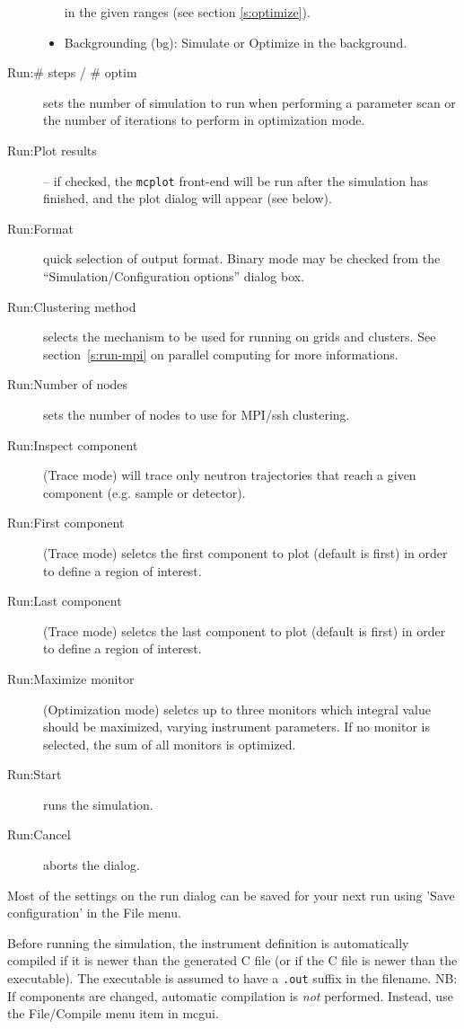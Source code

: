 \begin{description}
\begin{itemize}
    in the given ranges (see section \ref{s:optimize}).
  \item Backgrounding (bg): Simulate or Optimize in the background.
\end{itemize}
\item[Run:\# steps / \# optim] sets the number of simulation to run when
  performing a parameter scan or the number of iterations to
  perform in optimization mode.
\item[Run:Plot results] -- if checked, the \verb+mcplot+ front-end will be run
  after the simulation has finished, and the plot dialog will appear
  (see below).
\item[Run:Format] quick selection of output format. Binary mode may be checked
  from the ``Simulation/Configuration options'' dialog box.
\item[Run:Clustering method] selects the mechanism to be used for running on
  grids and clusters.  See section~\ref{s:run-mpi} on parallel computing for
  more informations.
\item[Run:Number of nodes] sets the number of nodes to use for MPI/ssh
  clustering.
\item[Run:Inspect component] (Trace mode) will trace only neutron trajectories
  that reach a given component (e.g. sample or detector).
\item[Run:First component] (Trace mode) seletcs the first component to plot
  (default is first) in order to define a region of interest.
\item[Run:Last component] (Trace mode) seletcs the last component to plot
  (default is first) in order to define a region of interest.
\item[Run:Maximize monitor] (Optimization mode) seletcs up to three monitors
  which integral value should be maximized, varying instrument parameters. If no
  monitor is selected, the sum of all monitors is optimized.
\item[Run:Start] runs the simulation.
\item[Run:Cancel] aborts the dialog.
\end{description}
Most of the settings on the run dialog can be saved for your next
\MCS run using 'Save configuration' in the File menu.

Before running the simulation, the instrument definition is automatically
compiled if it is newer than the generated C file (or if the C file is newer
than the executable). The executable is assumed to have a \verb+.out+ suffix in
the filename. NB: If components are changed, automatic compilation is \emph{not}
performed. Instead, use the File/Compile menu item in mcgui.



